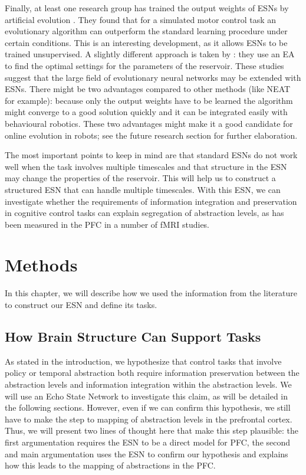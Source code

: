 \documentclass[10pt,a4paper]{report}
\begin{document}
Finally, at least one research group has trained the output weights of ESNs by artificial evolution \citep{Jiang2008, Devert2008, Hartland2009}. They found that for a simulated motor control task an evolutionary algorithm can outperform the standard learning procedure under certain conditions. This is an interesting development, as it allows ESNs to be trained unsupervised. A slightly different approach is taken by \cite{Krause2010}: they use an EA to find the optimal settings for the parameters of the reservoir. These studies suggest that the large field of evolutionary neural networks may be extended with ESNs. There might be two advantages compared to other methods (like NEAT for example): because only the output weights have to be learned the algorithm might converge to a good solution quickly \citep{Devert2008} and it can be integrated easily with behavioural robotics. These two advantages might make it a good candidate for online evolution in robots; see the future research section for further elaboration.

The most important points to keep in mind are that standard ESNs do not work well when the task involves multiple timescales and that structure in the ESN may change the properties of the reservoir. This will help us to construct a structured ESN that can handle multiple timescales. With this ESN, we can investigate whether the requirements of information integration and preservation in cognitive control tasks can explain segregation of abstraction levels, as has been measured in the PFC in a number of fMRI studies. 

\chapter{Methods}
In this chapter, we will describe how we used the information from the literature to construct our ESN and define its tasks.

\section{How Brain Structure Can Support Tasks}
As stated in the introduction, we hypothesize that control tasks that involve policy or temporal abstraction both require information preservation between the abstraction levels and information integration within the abstraction levels. We will use an Echo State Network to investigate this claim, as will be detailed in the following sections. However, even if we can confirm this hypothesis, we still have to make the step to mapping of abstraction levels in the prefrontal cortex. Thus, we will present two lines of thought here that make this step plausible: the first argumentation requires the ESN to be a direct model for PFC, the second and main argumentation uses the ESN to confirm our hypothesis and explains how this leads to the mapping of abstractions in the PFC.
\end{document}
